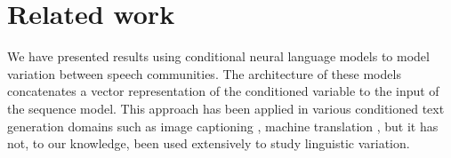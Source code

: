 \documentclass[11pt]{article}
\begin{document}









\section{Related work}\label{sec:related-work}

We have presented results using conditional neural language models
to model variation between speech communities.
The architecture of these models concatenates a vector representation
of the conditioned variable to the input of the sequence model.
This approach has been applied in various conditioned text generation domains such as 
image captioning \citep{Vinyals2015}, machine translation \citep{Kalchbrenner2013},
but it has not, to our knowledge, been used extensively to study linguistic variation.
\end{document}
